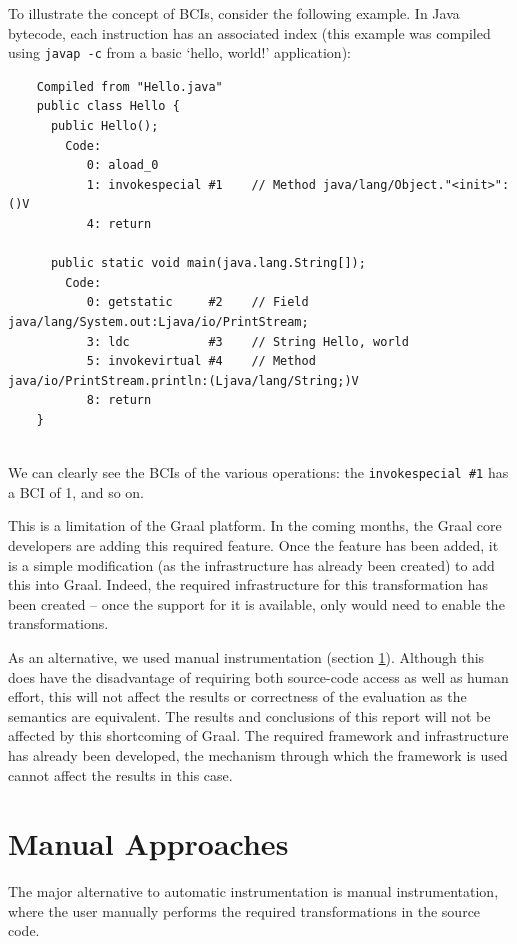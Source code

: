 	To illustrate the concept of BCIs, consider the following example. In Java bytecode, each instruction has an associated index (this example was compiled using \texttt{javap -c} from a basic `hello, world!' application):
	
	\begin{verbatim}
	Compiled from "Hello.java"
	public class Hello {
	  public Hello();
	    Code:
	       0: aload_0       
	       1: invokespecial #1    // Method java/lang/Object."<init>":()V
	       4: return        
	
	  public static void main(java.lang.String[]);
	    Code:
	       0: getstatic     #2    // Field java/lang/System.out:Ljava/io/PrintStream;
	       3: ldc           #3    // String Hello, world
	       5: invokevirtual #4    // Method java/io/PrintStream.println:(Ljava/lang/String;)V
	       8: return        
	}
	
	\end{verbatim}
	
	We can clearly see the BCIs of the various operations: the \texttt{invokespecial \#1} has a BCI of 1, and so on.

	This is a limitation of the Graal platform. In the coming months, the Graal core developers are adding this required feature. Once the feature has been added, it is a simple modification (as the infrastructure has already been created) to add this into Graal. Indeed, the required infrastructure for this transformation has been created -- once the support for it is available, only would need to enable the transformations.
	
	As an alternative, we used manual instrumentation (section \ref{sec:instrumentation/manual}). Although this does have the disadvantage of requiring both source-code access as well as human effort, this will not affect the results or correctness of the evaluation as the semantics are equivalent. The results and conclusions of this report will not be affected by this shortcoming of Graal. The required framework and infrastructure has already been developed, the mechanism through which the framework is used cannot affect the results in this case.
	
\section{Manual Approaches} \label{sec:instrumentation/manual}
The major alternative to automatic instrumentation is manual instrumentation, where the user manually performs the required transformations in the source code.

